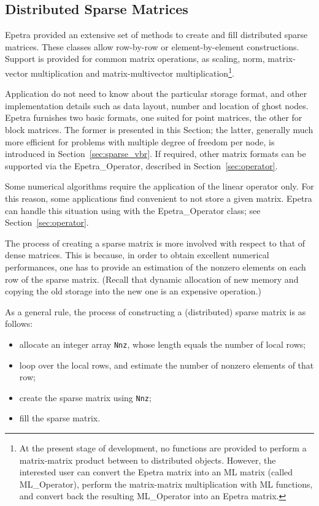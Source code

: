 
\subsection{Distributed Sparse Matrices}
\label{sec:sparse_mat}

Epetra provided an extensive set of methods to create and fill
distributed sparse matrices. These classes allow row-by-row or
element-by-element constructions. Support is provided for common matrix
operations, as scaling, norm, matrix-vector multiplication and
matrix-multivector multiplication\footnote{At the present stage of
  development, no functions are provided to perform a matrix-matrix
  product between to distributed objects. However, the interested user
  can convert the Epetra matrix into an ML matrix (called ML\_Operator),
  perform the matrix-matrix multiplication with ML functions, and
  convert back the resulting ML\_Operator into an Epetra matrix.}.

Application do not need to know about the particular storage format, and
other implementation details such as data layout, number and location of
ghost nodes. Epetra furnishes two basic formats, one suited for point
matrices, the other for block matrices. The former is presented in this
Section; the latter, generally much more efficient for problems with
multiple degree of freedom per node, is introduced in
Section~\ref{sec:sparse_vbr}. If required, other matrix formats can be
supported via the Epetra\_Operator, described in
Section~\ref{sec:operator}.

\begin{remark}
Some numerical algorithms require  the application of the linear
operator only. For this reason, some applications find convenient to not
store a given matrix. Epetra can handle this situation using with the
Epetra\_Operator class; see Section~\ref{sec:operator}.
\end{remark}

The process of creating a sparse matrix is more involved with respect to
that of dense matrices. This is because, in order to obtain excellent
numerical performances, one has to provide an estimation of the nonzero
elements on each row of the sparse matrix. (Recall that dynamic
allocation of new memory and copying the old storage into the new one is
an expensive operation.) 

As a general rule, the process of constructing a (distributed) sparse
matrix is as follows:
\begin{itemize}
\item allocate an integer array \verb!Nnz!, whose length equals the
  number of local rows;
\item loop over the local rows, and estimate the number of nonzero
  elements of that row;
\item create the sparse matrix using \verb!Nnz!;
\item fill the sparse matrix.
\end{itemize}

